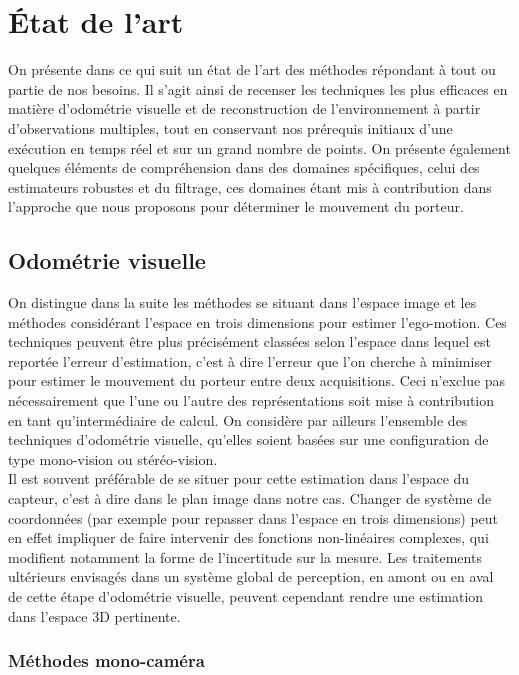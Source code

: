 \section{État de l'art} \label{sec:ch4_state_of_art}
On présente dans ce qui suit un état de l'art des méthodes répondant à tout ou partie de nos besoins. Il s'agit ainsi de recenser les techniques les plus efficaces en matière d'odométrie visuelle et de reconstruction de l'environnement à partir d'observations multiples, tout en conservant nos prérequis initiaux d'une exécution en temps réel et sur un grand nombre de points. On présente également quelques éléments de compréhension dans des domaines spécifiques, celui des estimateurs robustes et du filtrage, ces domaines étant mis à contribution dans l'approche  que nous proposons pour déterminer le mouvement du porteur.

\subsection{Odométrie visuelle} \label{sec:ch4_state_of_art_VO}
On distingue dans la suite les méthodes se situant dans l'espace image et les méthodes considérant l'espace en trois dimensions pour estimer l'ego-motion. Ces techniques peuvent être plus précisément classées selon l'espace dans lequel est reportée l'erreur d'estimation, c'est à dire l'erreur que l'on cherche à minimiser pour estimer le mouvement du porteur entre deux acquisitions. Ceci n'exclue pas nécessairement que l'une ou l'autre des représentations soit mise à contribution en tant qu'intermédiaire de calcul. On considère par ailleurs l'ensemble des techniques d'odométrie visuelle, qu'elles soient basées sur une configuration de type mono-vision ou stéréo-vision. \\
Il est souvent préférable de se situer pour cette estimation dans l'espace du capteur, c'est à dire dans le plan image dans notre cas. Changer de système de coordonnées (par exemple pour repasser dans l'espace en trois dimensions) peut en effet impliquer de faire intervenir des fonctions non-linéaires complexes, qui modifient notamment la forme de l'incertitude sur la mesure. Les traitements ultérieurs envisagés dans un système global de perception, en amont ou en aval de cette étape d'odométrie visuelle, peuvent cependant rendre une estimation dans l'espace 3D pertinente.

\subsubsection{Méthodes mono-caméra}
